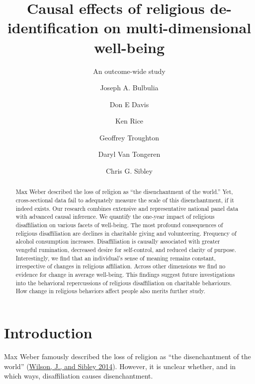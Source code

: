 \documentclass[
  singlecolumn]{report}
\title{Causal effects of religious de-identification on
multi-dimensional well-being}
\subtitle{An outcome-wide study}
\author{Joseph A. Bulbulia \and Don E Davis \and Ken Rice \and Geoffrey
Troughton \and Daryl Van Tongeren \and Chris G. Sibley}
\date{}
\begin{document}
\maketitle
\begin{abstract}
Max Weber described the loss of religion as ``the disenchantment of the
world.'' Yet, cross-sectional data fail to adequately measure the scale
of this disenchantment, if it indeed exists. Our research combines
extensive and representative national panel data with advanced causal
inference. We quantify the one-year impact of religious disaffiliation
on various facets of well-being. The most profound consequences of
religious disaffiliation are declines in charitable giving and
volunteering. Frequency of alcohol consumption increases. Disaffiliation
is causally associated with greater vengeful rumination, decreased
desire for self-control, and reduced clarity of purpose. Interestingly,
we find that an individual's sense of meaning remains constant,
irrespective of changes in religious affiliation. Across other
dimensions we find no evidence for change in average well-being. This
findings suggest future investigations into the behavioral repercussions
of religious disaffiliation on charitable behaviours. How change in
religious behaviors affect people also merits further study.
\end{abstract}
\ifdefined\Shaded\renewenvironment{Shaded}{\begin{tcolorbox}[interior hidden, enhanced, borderline west={3pt}{0pt}{shadecolor}, boxrule=0pt, frame hidden, sharp corners, breakable]}{\end{tcolorbox}}\fi

\listoffigures
\listoftables
\hypertarget{introduction}{%
\section{Introduction}\label{introduction}}

Max Weber famously described the loss of religion as ``the
disenchantment of the world''
(\protect\hyperlink{ref-wilson2014}{Wilson, J., and Sibley 2014}).
However, it is unclear whether, and in which ways, disaffiliation causes
disenchantment.
\end{document}
